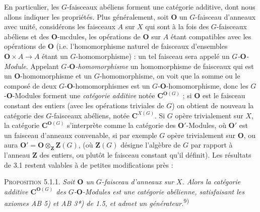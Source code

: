 \clearpage
{}

En particulier, les $G$-faisceaux abéliens forment une catégorie additive,
dont nous allons indiquer les propriétés.
Plus généralement, soit ${\mathbf O}$ un $G$-faisceau d'anneaux avec unité, considérons
les faisceaux $A$ sur $X$ qui sont à la fois des $G$-faisceaux abéliens et des
${\mathbf O}$-mcdules, les opérations de ${\mathbf O}$ sur $A$ étant compatibles avec les
opérations de ${\mathbf O}$ (i.e. l'homomorphisme naturel de faisceaux d'ensembles
${\mathbf O}\times A\to A$ étant un $G$-homomorphisme) : un tel faisceau
sera appelé un \textit{$G$-${\mathbf O}$-Module}. Appelant
\textit{$G$-${\mathbf O}$-homomorphisme} un homomorphisme de faisceaux qui est un
${\mathbf O}$-homomorphisme et un $G$-homomorphisme, on voit que la somme ou le composé
de deux $G$-${\mathbf O}$-homomorphismes est un $G$-${\mathbf O}$-homomorphisme,
donc les $G$-${\mathbf O}$-Modules forment une \textit{catégorie additive} notée
${\mathbf C}^{{\mathbf O}(G)}$ ; si ${\mathbf O}$ est le faisceau constant des entiers (avec les opérations
triviales de $G$) on obtient de nouveau la catégorie des $G$-faisceaux
abéliens, notée ${\mathbf C}^{X(G)}$.
Si $G$ opère trivialement sur $X$, la catégorie ${\mathbf C}^{{\mathbf O}(G)}$ s'interprète comme
la catégorie des ${\mathbf O}'$-Modules, où ${\mathbf O}'$ est un faisceau d'anneaux convenable,
si par exemple $G$ opère trivialement sur ${\mathbf O}$, ou aura
${\mathbf O}'={\mathbf O}\otimes_{\mathbf Z}\mathbf Z(G)$, (où $\mathbf Z(G)$ désigne l'algèbre
de $G$ par rapport à l'anneau $\mathbf Z$ des entiers, ou plutôt le faisceau
constant qu'il définit). Les résultats de 3.1 restent valables à de petites
modifications près :

\textsc{Proposition 5.1.1.} \textit{Soit ${\mathbf O}$ un $G$-faisceau
d'anneaux sur $X$. Alors la catégorie additive ${\mathbf C}^{{\mathbf O}(G)}$ des
$G$-${\mathbf O}$-Modules est une catégorie abélienne, satisfaisant les axiomes \textup{AB 5)}
et \textup{AB 3*)} de \textup{1.5}, et admet un générateur.}\textsuperscript{9)}

